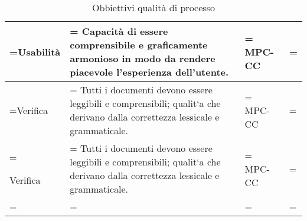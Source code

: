 \begin{xltabular}{\textwidth} {
        >{\hsize\linewidth=\hsize}X
        >{\hsize\linewidth=\hsize}X
        >{\hsize\linewidth=\hsize}X
        >{\hsize\linewidth=\hsize}X
    }
    Usabilità &
    Capacità di essere comprensibile e graficamente
    armonioso in modo da rendere piacevole l’esperienza
    dell’utente. &
    MPC-CC
    \\ \hline

    Verifica &
    Tutti i documenti devono essere leggibili e
    comprensibili; qualit`a che derivano dalla correttezza
    lessicale e grammaticale. &
    MPC-CC
    \\ \hline

    Verifica &
    Tutti i documenti devono essere leggibili e
    comprensibili; qualit`a che derivano dalla correttezza
    lessicale e grammaticale. &
    MPC-CC
    \\ \hline

    \caption{Obbiettivi qualità di processo}
\end{xltabular}